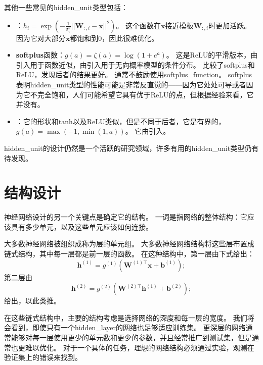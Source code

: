其他一些常见的\gls{hidden_unit}类型包括：
\begin{itemize}
\item {}：$h_i = \exp \left (-\frac{1}{\sigma_i^2}|| \bm{W}_{:,i}-\bm{x}||^2 \right )$。
这个函数在$\bm{x}$接近模板$\bm{W}_{:,i}$时更加活跃。
因为它对大部分$\bm{x}$都饱和到0，因此很难优化。

\item \textbf{\gls{softplus}}函数：$g(a)=\zeta(a)=\log(1+e^a)$。
这是\gls{ReLU}的平滑版本，由\cite{Dugas01}引入用于函数近似，由\cite{Nair-2010-small}引入用于无向概率模型的条件分布。
\cite{Glorot+al-AI-2011-small}比较了softplus和\gls{ReLU}，发现后者的结果更好。
通常不鼓励使用\gls{softplus_function}。
softplus表明\gls{hidden_unit}类型的性能可能是非常反直觉的——因为它处处可导或者因为它不完全饱和，人们可能希望它具有优于\gls{ReLU}的点，但根据经验来看，它并没有。

\item {}：它的形状和$\text{tanh}$以及\gls{ReLU}类似，但是不同于后者，它是有界的，$g(a)=\max(-1, \min(1,a))$。
它由\cite{Collobert04}引入。
\end{itemize}

\gls{hidden_unit}的设计仍然是一个活跃的研究领域，许多有用的\gls{hidden_unit}类型仍有待发现。

\section{结构设计}
\label{sec:architecture_design}

神经网络设计的另一个关键点是确定它的结构。
一词是指网络的整体结构：它应该具有多少单元，以及这些单元应该如何连接。


大多数神经网络被组织成称为层的单元组。
大多数神经网络结构将这些层布置成链式结构，其中每一层都是前一层的函数。
在这种结构中，第一层由下式给出：
\begin{equation}
\bm{h}^{(1)}= g^{(1)}\left ( \bm{W}^{(1)\top} \bm{x} + \bm{b}^{(1)}\right );
\end{equation}
第二层由
\begin{equation}
\bm{h}^{(2)} = g^{(2)}\left ( \bm{W}^{(2)\top}\bm{h}^{(1)}+\bm{b}^{(2)} \right );
\end{equation}
给出，以此类推。

在这些链式结构中，主要的结构考虑是选择网络的深度和每一层的宽度。
我们将会看到，即使只有一个\gls{hidden_layer}的网络也足够适应训练集。
更深层的网络通常能够对每一层使用更少的单元数和更少的参数，并且经常推广到测试集，但是通常也更难以优化。
对于一个具体的任务，理想的网络结构必须通过实验，观测在验证集上的错误来找到。

